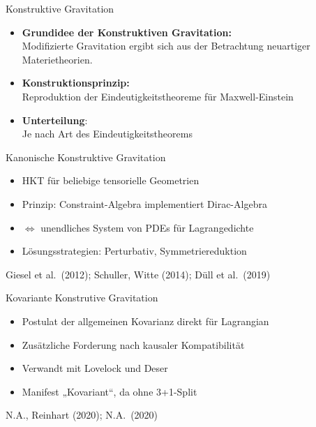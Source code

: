 \documentclass{beamer}
\begin{document}
    \begin{frame}{Konstruktive Gravitation}
        \begin{itemize}
            \item \textbf{Grundidee der Konstruktiven Gravitation:} \\
            Modifizierte Gravitation ergibt sich aus der Betrachtung neuartiger Materietheorien.
            \item \textbf{Konstruktionsprinzip:} \\
            Reproduktion der Eindeutigkeitstheoreme für Maxwell-Einstein
            \item \textbf{Unterteilung}: \\
            Je nach Art des Eindeutigkeitstheorems
        \end{itemize}
    \end{frame}

    \begin{frame}{Kanonische Konstruktive Gravitation}
        \begin{itemize}
            \item HKT für beliebige tensorielle Geometrien
            \item Prinzip: Constraint-Algebra implementiert Dirac-Algebra
            \item $\Leftrightarrow$ unendliches System von PDEs für Lagrangedichte
            \item Lösungsstrategien: Perturbativ, Symmetriereduktion
        \end{itemize}

        \raggedleft\scriptsize \lbrack Giesel et al.\ (2012); Schuller, Witte (2014); Düll et al.\ (2019) \rbrack
    \end{frame}

    \begin{frame}{Kovariante Konstrutive Gravitation}
        \begin{itemize}
            \item Postulat der allgemeinen Kovarianz direkt für Lagrangian
            \item Zusätzliche Forderung nach kausaler Kompatibilität
            \item Verwandt mit Lovelock und Deser
            \item Manifest „Kovariant“, da ohne 3+1-Split
        \end{itemize}

        \raggedleft\scriptsize \lbrack N.A., Reinhart (2020); N.A.\ (2020) \rbrack
    \end{frame}
\end{document}
